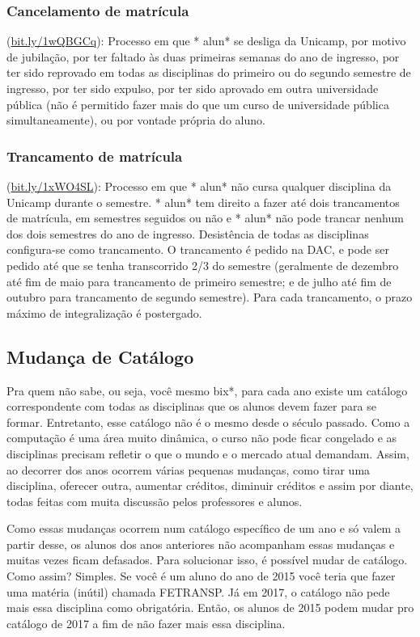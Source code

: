 \subsubsection{Cancelamento de matrícula} (\url{bit.ly/1wQBGCq}): Processo em
que * alun* se desliga da Unicamp, por motivo de jubilação, por ter faltado às
duas primeiras semanas do ano de ingresso, por ter sido reprovado em todas as
disciplinas do primeiro ou do segundo semestre de ingresso, por ter sido
expulso, por ter sido aprovado em outra universidade pública (não é permitido
fazer mais do que um curso de universidade pública simultaneamente), ou por
vontade própria do aluno.
\subsubsection{Trancamento de matrícula} (\url{bit.ly/1xWO4SL}): Processo em que
* alun* não cursa qualquer disciplina da Unicamp durante o semestre. * alun* tem
direito a fazer até dois trancamentos de matrícula, em semestres seguidos ou não
e * alun* não pode trancar nenhum dos dois semestres do ano de
ingresso. Desistência de todas as disciplinas configura-se como trancamento. O
trancamento é pedido na DAC, e pode ser pedido até que se tenha transcorrido 2/3
do semestre (geralmente de dezembro até fim de maio para trancamento de primeiro
semestre; e de julho até fim de outubro para trancamento de segundo
semestre). Para cada trancamento, o prazo máximo de integralização é postergado.

\subsection{Mudança de Catálogo}

Pra quem não sabe, ou seja, você mesmo bix*, para cada ano existe um catálogo
correspondente com todas as disciplinas que os alunos devem fazer para se
formar.  Entretanto, esse catálogo não é o mesmo desde o século passado. Como a
computação é uma área muito dinâmica, o curso não pode ficar congelado e as
disciplinas precisam refletir o que o mundo e o mercado atual demandam. Assim,
ao decorrer dos anos ocorrem várias pequenas mudanças, como tirar uma
disciplina, oferecer outra, aumentar créditos, diminuir créditos e assim por
diante, todas feitas com muita discussão pelos professores e alunos.

Como essas mudanças ocorrem num catálogo específico de um ano e só valem a
partir desse, os alunos dos anos anteriores não acompanham essas mudanças e
muitas vezes ficam defasados. Para solucionar isso, é possível mudar de
catálogo.  Como assim? Simples. Se você é um aluno do ano de 2015 você teria que
fazer uma matéria (inútil) chamada FETRANSP. Já em 2017, o catálogo não pede
mais essa disciplina como obrigatória. Então, os alunos de 2015 podem mudar pro
catálogo de 2017 a fim de não fazer mais essa disciplina.

